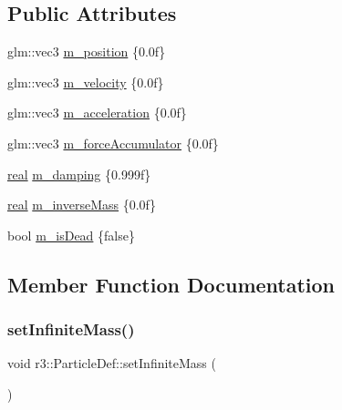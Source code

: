 \subsection*{Public Attributes}
\begin{DoxyCompactItemize}
\item 
glm\+::vec3 \mbox{\hyperlink{structr3_1_1_particle_def_ac608a2d4c722142aa767187ca2f0dc3e}{m\+\_\+position}} \{0.\+0f\}
\item 
glm\+::vec3 \mbox{\hyperlink{structr3_1_1_particle_def_a0c69fb8b0e2994e5ff24aa1156bdb5fd}{m\+\_\+velocity}} \{0.\+0f\}
\item 
glm\+::vec3 \mbox{\hyperlink{structr3_1_1_particle_def_a231397eab290672708245641223a7cc9}{m\+\_\+acceleration}} \{0.\+0f\}
\item 
glm\+::vec3 \mbox{\hyperlink{structr3_1_1_particle_def_a4b27ae926a85c8453a5e33ad64fc5c72}{m\+\_\+force\+Accumulator}} \{0.\+0f\}
\item 
\mbox{\hyperlink{namespacer3_ab2016b3e3f743fb735afce242f0dc1eb}{real}} \mbox{\hyperlink{structr3_1_1_particle_def_a76008c519d8c2fd21b7c866708dceb5c}{m\+\_\+damping}} \{0.\+999f\}
\item 
\mbox{\hyperlink{namespacer3_ab2016b3e3f743fb735afce242f0dc1eb}{real}} \mbox{\hyperlink{structr3_1_1_particle_def_a7ae250681e8ce19b47d642195bb328b4}{m\+\_\+inverse\+Mass}} \{0.\+0f\}
\item 
bool \mbox{\hyperlink{structr3_1_1_particle_def_a76af421a2ee1f9f3c82bdc388f71d1ba}{m\+\_\+is\+Dead}} \{false\}
\end{DoxyCompactItemize}


\subsection{Member Function Documentation}
\mbox{\label{structr3_1_1_particle_def_a779364b02815c9e4ea30678ea4031445}} 
\subsubsection{\texorpdfstring{set\+Infinite\+Mass()}{setInfiniteMass()}}
{\footnotesize\ttfamily void r3\+::\+Particle\+Def\+::set\+Infinite\+Mass (\begin{DoxyParamCaption}{ }\end{DoxyParamCaption})}

